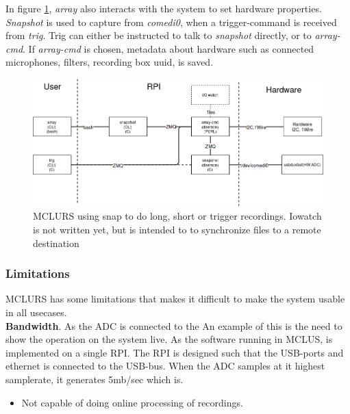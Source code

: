 In figure \ref{fig:mclurs:snapshot}, \textit{array} also interacts with the system to set hardware properties. \textit{Snapshot} is used to capture from \textit{comedi0}, when a trigger-command is received from \textit{trig}.
Trig can either be instructed to talk to \textit{snapshot} directly, or to \textit{array-cmd}. If \textit{array-cmd} is chosen, metadata about hardware such as connected microphones, filters, recording box uuid, is saved.

\begin{figure}[h!]
	\centering
	\includegraphics[width=\textwidth]{figures/mclurs_app2}
	\caption{MCLURS using snap to do long, short or trigger recordings. Iowatch is not written yet, but is intended to to synchronize files to a remote destination} \label{fig:mclurs:snapshot}
\end{figure}

\subsubsection{Limitations} \label{sec:exisingsystem:limitations}
MCLURS has some limitations that makes it difficult to make the system usable in all usecases.  \\

\textbf{Bandwidth}. As the ADC is connected to the 
An example of this is the need to show the operation on the system live. 
As the software running in MCLUS, is implemented on a single RPI. The RPI is designed such that the USB-ports and ethernet is connected to the USB-bus. When the ADC samples at it highest samplerate, it generates 5mb/sec which is.

\begin{itemize}
	\item Not capable of doing online processing of recordings.
\end{itemize}

